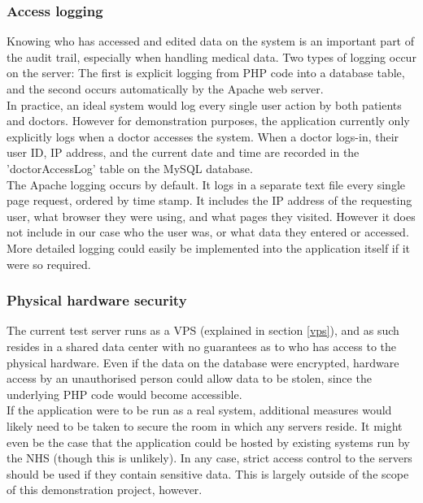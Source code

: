 \documentclass[11pt]{article}
\begin{document}
\subsubsection{Access logging}
Knowing who has accessed and edited data on the system is an important part of the audit trail, especially when handling medical data. Two types of logging occur on the server: The first is explicit logging from PHP code into a database table, and the second occurs automatically by the Apache web server. 
\\ \indent
In practice, an ideal system would log every single user action by both patients and doctors. However for demonstration purposes, the application currently only explicitly logs when a doctor accesses the system. When a doctor logs-in, their user ID, IP address, and the current date and time are recorded in the 'doctorAccessLog' table on the MySQL database.
\\ \indent
The Apache logging occurs by default. It logs in a separate text file every single page request, ordered by time stamp. It includes the IP address of the requesting user, what browser they were using, and what pages they visited. However it does not include in our case who the user was, or what data they entered or accessed. More detailed logging could easily be implemented into the application itself if it were so required.

\subsubsection{Physical hardware security}
The current test server runs as a VPS (explained in section \ref{vps}), and as such resides in a shared data center with no guarantees as to who has access to the physical hardware. Even if the data on the database were encrypted, hardware access by an unauthorised person could allow data to be stolen, since the underlying PHP code would become accessible. 
\\ \indent
If the application were to be run as a real system, additional measures would likely need to be taken to secure the room in which any servers reside. It might even be the case that the application could be hosted by existing systems run by the NHS (though this is unlikely). In any case, strict access control to the servers should be used if they contain sensitive data. This is largely outside of the scope of this demonstration project, however. 

\end{document}
